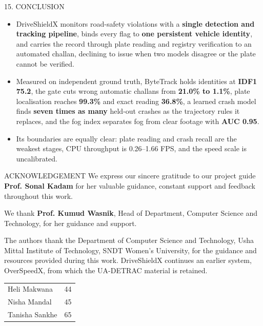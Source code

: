 \documentclass[aspectratio=169,10pt,t]{beamer}
\newcommand{\rollHeli}{44}
\newcommand{\rollNisha}{45}
\newcommand{\rollTanisha}{65}
\begin{document}
\begin{frame}{15. CONCLUSION}
\small
\begin{itemize}\setlength{\itemsep}{0.45em}
  \item DriveShieldX monitors road-safety violations with a \textbf{single detection and tracking pipeline}, binds
        every flag to \textbf{one persistent vehicle identity}, and carries the record through plate reading and
        registry verification to an automated challan, declining to issue when two models disagree or the plate
        cannot be verified.
  \item Measured on independent ground truth, ByteTrack holds identities at \textbf{IDF1 75.2}, the gate cuts wrong
        automatic challans from \textbf{21.0\% to 1.1\%}, plate localisation reaches \textbf{99.3\%} and exact reading
        \textbf{36.8\%}, a learned crash model finds \textbf{seven times as many} held-out crashes as the trajectory
        rules it replaces, and the fog index separates fog from clear footage with \textbf{AUC 0.95}.
  \item Its boundaries are equally clear: plate reading and crash recall are the weakest stages, CPU throughput is
        0.26--1.66 FPS, and the speed scale is uncalibrated.
\end{itemize}
\end{frame}

\begin{frame}{ACKNOWLEDGEMENT}
\small
\vspace{0.5em}
We express our sincere gratitude to our project guide \textbf{Prof. Sonal Kadam} for her valuable guidance,
constant support and feedback throughout this work.

\vspace{0.6em}
We thank \textbf{Prof. Kumud Wasnik}, Head of Department, Computer Science and Technology, for her guidance and support.

\vspace{0.6em}
The authors thank the Department of Computer Science and Technology, Usha Mittal Institute of Technology, SNDT Women's
University, for the guidance and resources provided during this work. DriveShieldX continues an earlier system,
OverSpeedX, from which the UA-DETRAC material is retained.

\vspace{1.2em}
\begin{flushright}
\begin{tabular}{@{}ll@{}}
Heli Makwana & \rollHeli\\
Nisha Mandal & \rollNisha\\
Tanisha Sankhe & \rollTanisha\\
\end{tabular}
\end{flushright}
\end{frame}
\end{document}
